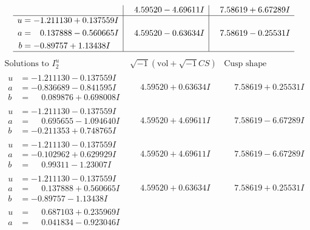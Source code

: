 \documentclass[1p]{elsarticle_modified}
\theoremstyle{definition}
\newcommand{\I}{\sqrt{-1}}
\begin{document}
$$\begin{array}{c|c|c}
 & \phantom{-}4.59520 - 4.69611 I & \phantom{-}7.58619 + 6.67289 I \\ \hline\begin{aligned}
u &= -1.211130 + 0.137559 I \\
a &= \phantom{-}0.137888 - 0.560665 I \\
b &= -0.89757 + 1.13438 I\end{aligned}
 & \phantom{-}4.59520 - 0.63634 I & \phantom{-}7.58619 - 0.25531 I\\
 \hline 
 \end{array}$$\newpage$$\begin{array}{c|c|c}  
\text{Solutions to }I^u_{2}& \I (\text{vol} + \sqrt{-1}CS) & \text{Cusp shape}\\
 \hline 
\begin{aligned}
u &= -1.211130 - 0.137559 I \\
a &= -0.836689 - 0.841595 I \\
b &= \phantom{-}0.089876 + 0.698008 I\end{aligned}
 & \phantom{-}4.59520 + 0.63634 I & \phantom{-}7.58619 + 0.25531 I \\ \hline\begin{aligned}
u &= -1.211130 - 0.137559 I \\
a &= \phantom{-}0.695655 - 1.094640 I \\
b &= -0.211353 + 0.748765 I\end{aligned}
 & \phantom{-}4.59520 + 4.69611 I & \phantom{-}7.58619 - 6.67289 I \\ \hline\begin{aligned}
u &= -1.211130 - 0.137559 I \\
a &= -0.102962 + 0.629929 I \\
b &= \phantom{-}0.99311 - 1.23007 I\end{aligned}
 & \phantom{-}4.59520 + 4.69611 I & \phantom{-}7.58619 - 6.67289 I \\ \hline\begin{aligned}
u &= -1.211130 - 0.137559 I \\
a &= \phantom{-}0.137888 + 0.560665 I \\
b &= -0.89757 - 1.13438 I\end{aligned}
 & \phantom{-}4.59520 + 0.63634 I & \phantom{-}7.58619 + 0.25531 I \\ \hline\begin{aligned}
u &= \phantom{-}0.687103 + 0.235969 I \\
a &= \phantom{-}0.041834 - 0.923046 I \\

\end{aligned}
\end{array}$$
\end{document}
